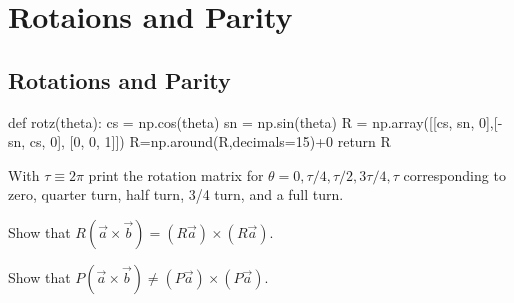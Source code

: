 \chapter{Rotaions and Parity}
  
\section{Rotations and Parity}

\begin{python}
def rotz(theta):
    cs = np.cos(theta)
    sn = np.sin(theta)
    R  = np.array([[cs, sn, 0],[-sn, cs, 0], [0, 0, 1]])
    R=np.around(R,decimals=15)+0
    return R
\end{python}

\begin{plot} With $\tau \equiv 2 \pi$ print the rotation matrix for $\theta = 0, \tau/4, \tau/2, 3 \tau/4, \tau$ corresponding to zero, quarter turn, half turn, 3/4 turn, and a full turn.\end{plot}



\begin{plot} Show that $R(\vec{a} \times \vec{b}) = (R\vec{a}) \times (R\vec{a})$.\end{plot}


\begin{plot} Show that $P(\vec{a} \times \vec{b}) \neq (P\vec{a}) \times (P\vec{a})$.\end{plot}

